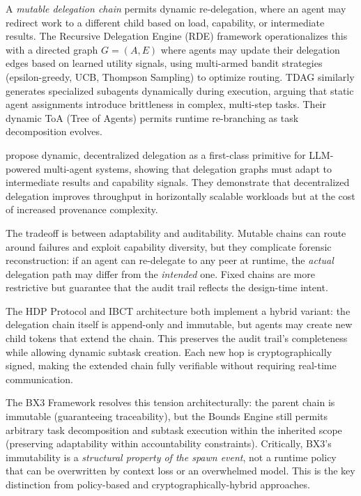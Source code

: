 A \emph{mutable delegation chain} permits dynamic re-delegation, where an agent may redirect work to a different child based on load, capability, or intermediate results. The Recursive Delegation Engine (RDE) framework \citep{intelligent2025} operationalizes this with a directed graph $G = (A, E)$ where agents may update their delegation edges based on learned utility signals, using multi-armed bandit strategies (epsilon-greedy, UCB, Thompson Sampling) to optimize routing. TDAG \citep{tdag2024} similarly generates specialized subagents dynamically during execution, arguing that static agent assignments introduce brittleness in complex, multi-step tasks. Their dynamic ToA (Tree of Agents) permits runtime re-branching as task decomposition evolves.

 propose dynamic, decentralized delegation as a first-class primitive for LLM-powered multi-agent systems, showing that delegation graphs must adapt to intermediate results and capability signals. They demonstrate that decentralized delegation improves throughput in horizontally scalable workloads but at the cost of increased provenance complexity.

The tradeoff is between adaptability and auditability. Mutable chains can route around failures and exploit capability diversity, but they complicate forensic reconstruction: if an agent can re-delegate to any peer at runtime, the \emph{actual} delegation path may differ from the \emph{intended} one. Fixed chains are more restrictive but guarantee that the audit trail reflects the design-time intent.

The HDP Protocol \citep{draft-helixar-hdp} and IBCT architecture \citep{aip2025} both implement a hybrid variant: the delegation chain itself is append-only and immutable, but agents may create new child tokens that extend the chain. This preserves the audit trail's completeness while allowing dynamic subtask creation. Each new hop is cryptographically signed, making the extended chain fully verifiable without requiring real-time communication.

The BX3 Framework resolves this tension architecturally: the parent chain is immutable (guaranteeing traceability), but the Bounds Engine still permits arbitrary task decomposition and subtask execution within the inherited scope (preserving adaptability within accountability constraints). Critically, BX3's immutability is a \emph{structural property of the spawn event}, not a runtime policy that can be overwritten by context loss or an overwhelmed model. This is the key distinction from policy-based and cryptographically-hybrid approaches.

